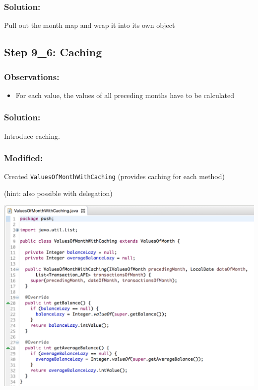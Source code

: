 \documentclass[a4paper,fleqn,titlepage,11pt]{article}
\begin{document}
\subsubsection*{Solution:}

Pull out the month map and wrap it into its own object

\subsection*{Step 9\_6: Caching}

\subsubsection*{Observations:}
\begin{itemize}
\item For each value, the values of all preceding months have to be calculated
\end{itemize}

\subsubsection*{Solution:}

Introduce caching.

\subsubsection*{Modified:}

Created \texttt{ValuesOfMonthWithCaching} (provides caching for each method)

(hint: also possible with delegation)

\includegraphics[width=1\textwidth]{CompareViews/09_6-1.png}
\end{document}
